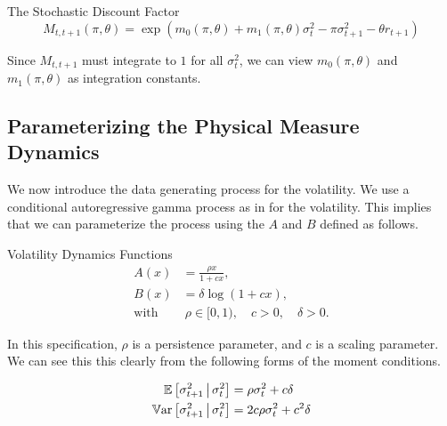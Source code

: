 \documentclass[11pt, letterpaper, twoside, final]{article}
\begin{document}
\begin{defn}{The Stochastic Discount Factor}
    \label{defn:SDF}
    \begin{equation}
        M_{t,t+1}(\pi, \theta) = \exp\left(m_{0}(\pi, \theta) + m_1(\pi, \theta) \sigma_t^2 - \pi \sigma^2_{t+1} -
        \theta r_{t+1}\right) 
    \end{equation}
\end{defn}

Since $M_{t,t+1}$ must integrate to $1$ for all $\sigma^2_t$, we can view $m_{0}(\pi, \theta)$ and $m_1(\pi,
\theta)$ as integration constants.

\subsection{Parameterizing the Physical Measure Dynamics}

We now introduce the data generating process for the volatility.
We use a conditional autoregressive gamma process as in \textcite{gourieroux2006autoregressive, khrapov2016affine}
for the volatility.
This implies that we can parameterize the process using the $A$ and $B$ defined as follows.

\begin{defn}{Volatility Dynamics Functions}
    \label{defn:physical_vol_dynamics}
    \begin{align}
        \label{defn:a_PP}
        A(x) &= \frac{\rho x}{1 + c x}, \\
        \label{defn:b_PP}
        B(x) &= \delta \log(1 + c x),\\
% 
        \text{with}&\  \rho \in [0,1), \quad c > 0, \quad \delta > 0. \nonumber
    \end{align}

\end{defn}

\noindent In this specification, $\rho$ is a persistence parameter, and $c$ is a scaling parameter.
We can see this this clearly from the following forms of the moment conditions.

\begin{remark} 
    \label{remark:vol_moment_conditions}
    \begin{align}
        \E\left[\sigma^2_{t+1} \mvert \sigma^2_t \right]  &= \rho \sigma^2_t  + c \delta\\
%
        \Var\left[\sigma^2_{t+1} \mvert \sigma^2_t \right]  &=  2 c \rho \sigma^2_t  + c^2
        \delta 
%
    \end{align}
\end{remark}
\end{document}

